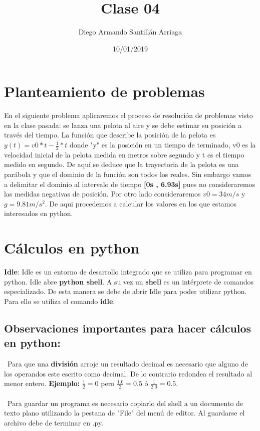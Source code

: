 \documentclass[letter paper, 12pt, oneside]{article}
\title{\Huge Clase 04}
\author{Diego Armando Santillán Arriaga}
\date{10/01/2019}
\begin{document}
	\maketitle
\newpage
\section{Planteamiento de problemas}


En el siguiente problema aplicaremos el proceso de resolución de problemas visto en la clase pasada: se lanza una pelota al aire y se debe estimar su posición a través del tiempo. 
La función que describe la posición de la pelota es \textbf{$y(t) = v0*t-\frac{1}{2}*t$} donde "y" es la posición en un tiempo de terminado, v0 es la velocidad inicial de la pelota medida en metros sobre segundo y t es el tiempo medido en segundo. De aquí se deduce que la trayectoria de la pelota es una parábola y que el dominio de la función son todos los reales. Sin embargo vamos a delimitar el dominio al intervalo de tiempo \textbf{[0s , 6.93s]} pues no consideraremos las medidas negativas de posición. Por otro lado consideraremos $v0 = 34 m/s$ y $g = 9.81 m/s^{2}$. De aqui procedemos a calcular los valores en los que estamos interesados en python. 


\section{Cálculos en python}

\textbf{Idle}: Idle es un entorno de desarrollo integrado que se utiliza para programar en python. Idle abre \textbf{python shell}. A su vez un  \textbf{shell} es un intérprete de comandos especializado. De esta manera se debe de abrir Idle para poder utilizar python. Para ello se utiliza el comando \textbf{idle}.

\subsection{Observaciones importantes para hacer cálculos en python:}

~Para que una \textbf{división} arroje un resultado decimal es necesario que alguno de los operandos este escrito como decimal. De lo contrario redondea el resultado al menor entero. \textbf{Ejemplo:} $\frac{1}{2} = 0$ pero $\frac{1.0}{2} = 0.5$ ó $\frac{1}{2.0} = 0.5$.
\\\\
~Para guardar un programa es necesario copiarlo del shell a un documento de texto plano utilizando la pestana de "File" del menú de editor. Al guardarse el archivo debe de terminar en .py.
\end{document}
